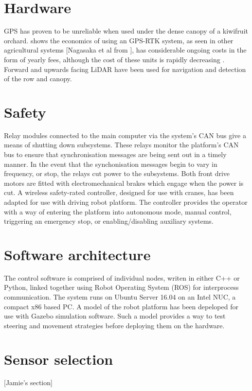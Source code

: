 \documentclass[preprint,authoryear,12pt]{elsarticle}
\begin{document}
\section{Hardware}
\label{sect:hardware}
    GPS has proven to be unreliable when used under the dense canopy of a kiwifruit orchard.
    \citep{Pedersen2006} shows the economics of using an GPS-RTK system, as seen in other agricultural systems \citep{Bak2004,Ruckelshausen2009}[Nagasaka et al from \citep{Torii2000}], has considerable ongoing costs in the form of yearly fees, although the cost of these units is rapidly decreasing \citep{Torii2000}.
    Forward and upwards facing LiDAR have been used for navigation and detection of the row and canopy.

\section{Safety}
\label{sect:safety}
    Relay modules connected to the main computer via the system's CAN bus give a means of shutting down subsystems.
    These relays monitor the platform's CAN bus to ensure that synchronisation messages are being sent out in a timely manner.
    In the event that the synchonisation messages begin to vary in frequency, or stop, the relays cut power to the subsystems.
    Both front drive motors are fitted with electromechanical brakes which engage when the power is cut.
    A wireless safety-rated controller, designed for use with cranes, has been adapted for use with driving robot platform.
    The controller provides the operator with a way of entering the platform into autonomous mode, manual control, triggering an emergency stop, or enabling/disabling auxiliary systems.

\section{Software architecture}
\label{sect:software}
    The control software is comprised of individual nodes, writen in either C++ or Python, linked together using Robot Operating System (ROS) for interprocess communication.
    The system runs on Ubuntu Server 16.04 on an Intel NUC, a compact x86 based PC.
    A model of the robot platform has been depeloped for use with Gazebo simulation software.
    Such a model provides a way to test steering and movement strategies before deploying them on the hardware.

\section{Sensor selection}
\label{sect:sensors}
    [Jamie's section]
\end{document}
